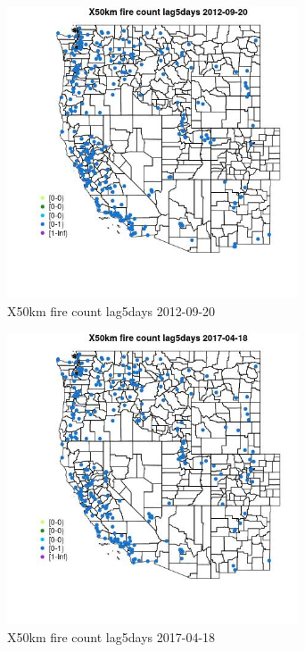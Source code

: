 \begin{figure} 
\centering  
\includegraphics[width=0.77\textwidth]{Code_Outputs/Report_ML_input_PM25_Step4_part_e_de_duplicated_aves_compiled_2019-05-14wNAs_MapObsX50km_fire_count_lag5days2012-09-20.jpg} 
\caption{\label{fig:Report_ML_input_PM25_Step4_part_e_de_duplicated_aves_compiled_2019-05-14wNAsMapObsX50km_fire_count_lag5days2012-09-20}X50km fire count lag5days 2012-09-20} 
\end{figure} 
 

\begin{figure} 
\centering  
\includegraphics[width=0.77\textwidth]{Code_Outputs/Report_ML_input_PM25_Step4_part_e_de_duplicated_aves_compiled_2019-05-14wNAs_MapObsX50km_fire_count_lag5days2017-04-18.jpg} 
\caption{\label{fig:Report_ML_input_PM25_Step4_part_e_de_duplicated_aves_compiled_2019-05-14wNAsMapObsX50km_fire_count_lag5days2017-04-18}X50km fire count lag5days 2017-04-18} 
\end{figure} 
 

